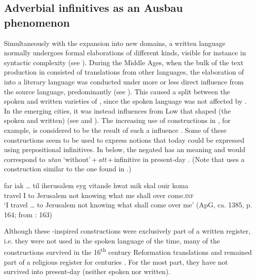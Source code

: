 \documentclass[output=paper]{langscibook}
\begin{document}
\subsection{Adverbial infinitives as an Ausbau phenomenon}\label{sec:kalm:5.2}


Simultaneously with the expansion into new domains, a written language normally undergoes formal elaborations of different kinds, visible for instance in syntactic complexity (see \cites[38--39]{Fischer2007}[]{Kloss1967}). During the Middle Ages, when the bulk of the text production in  consisted of translations from other languages, the elaboration of  into a literary language was conducted under more or less direct influence from the source language, predominantly  (see \citealt{Wollin1981,Wollin1983,Hoder2009, Hoder2010}). This caused a split between the spoken and written varieties of , since the spoken language was not affected by . In the emerging cities, it was instead influences from Low  that shaped (the spoken and written)  (see  and ). The increasing use of  constructions in , for example, is considered to be the result of such a  influence \citep{Ahlberg1942,Hoder2010}. Some of these  constructions seem to be used to express  notions that today could be expressed using prepositional infinitives. In  below, the negated  has an  meaning and would correspond to \textit{utan} ‘without’\,+\,\textit{att}\,+\,infinitive in present-day . (Note that  uses a construction similar to the one found in .)


\ea 
\label{ex:kalm:33}
 \gll far {iak …} til iherusalem eyg vitande hwat mik skal ouir koma\\ 
travel I to Jerusalem not knowing what me shall over come.\textsc{inf}\\
 \glt ‘I travel … to Jerusalem not knowing what shall come over me’ (ApG, ca. 1385, p. 164; from \citealt{Ahlberg1942}: 163)
\z


Although these -inspired constructions were exclusively part of a written register, i.e. they were not used in the spoken language of the time, many of the  constructions survived in the 16\textsuperscript{th} century Reformation  translations and remained part of a religious register for centuries \citep[17–19]{Stahle1970}. For the most part, they have not survived into present-day  (neither spoken nor written). 
\end{document}
